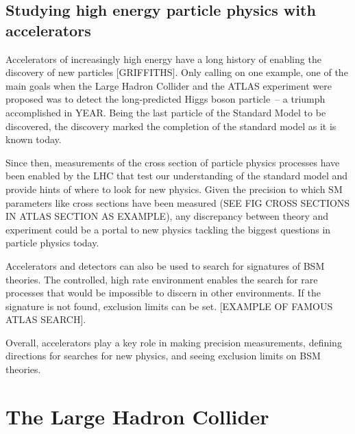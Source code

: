 \subsection{Studying high energy particle physics with accelerators}

Accelerators of increasingly high energy have a long history of enabling the discovery of new particles [GRIFFITHS]. Only calling on one example, one of the main goals when the Large Hadron Collider and the ATLAS experiment were proposed was to detect the long-predicted Higgs boson particle~-- a triumph accomplished in YEAR. Being the last particle of the Standard Model to be discovered, the discovery marked the completion of the standard model as it is known today.

Since then, measurements of the cross section of particle physics processes have been enabled by the LHC that test our understanding of the standard model and provide hints of where to look for new physics. %
Given the precision to which SM parameters like cross sections have been measured (SEE FIG CROSS SECTIONS IN ATLAS SECTION AS EXAMPLE), any discrepancy between theory and experiment could be a portal to new physics tackling the biggest questions in particle physics today. 

Accelerators and detectors can also be used to search for signatures of BSM theories. The controlled, high rate environment enables the search for rare processes that would be impossible to discern in other environments. If the signature is not found, exclusion limits can be set. [EXAMPLE OF FAMOUS ATLAS SEARCH].

Overall, accelerators play a key role in making precision measurements, defining directions for searches for new physics, and seeing exclusion limits on BSM theories.

\section{The Large Hadron Collider}

